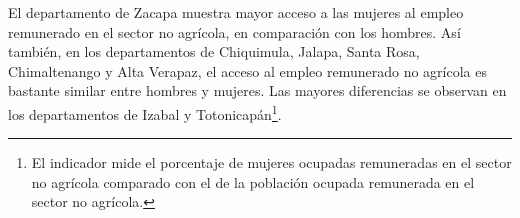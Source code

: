 El departamento de Zacapa muestra mayor acceso a las mujeres al empleo remunerado en el sector no agrícola, en comparación con los hombres. Así también, en los departamentos de Chiquimula, Jalapa, Santa Rosa, Chimaltenango y Alta Verapaz, el acceso al empleo remunerado no agrícola es bastante similar entre hombres y mujeres. Las mayores diferencias se observan en los departamentos de Izabal y Totonicapán\footnote{El indicador mide el porcentaje de mujeres ocupadas remuneradas en el sector no agrícola comparado con el  de la población ocupada remunerada en el sector no agrícola.}.